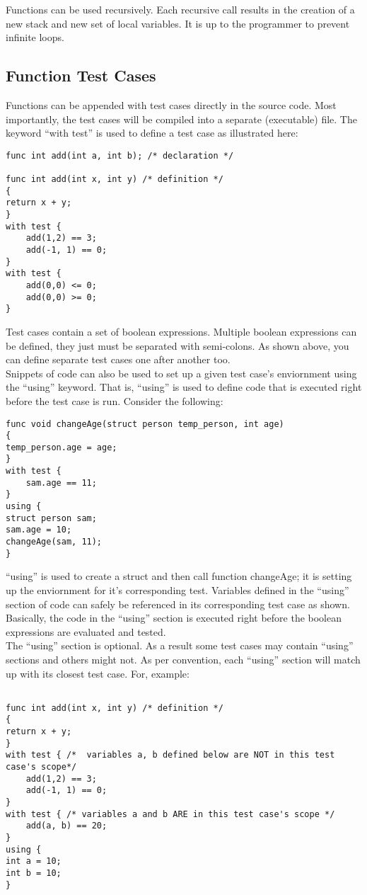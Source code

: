 \documentclass{article}
\begin{document}
Functions can be used recursively. Each recursive call results in the creation of a new stack and new set of local variables. It is up to the programmer to prevent infinite loops. 

\subsection{Function Test Cases}
Functions can be appended with test cases directly in the source code. Most importantly, the test cases will be compiled into a separate (executable) file. The keyword ``with test'' is used to define a test case as illustrated here:

\begin{lstlisting}
func int add(int a, int b); /* declaration */

func int add(int x, int y) /* definition */
{
return x + y;
}
with test {
	add(1,2) == 3;
	add(-1, 1) == 0;
}
with test {
	add(0,0) <= 0;
	add(0,0) >= 0; 
}

\end{lstlisting}
Test cases contain a set of boolean expressions. Multiple boolean expressions can be defined, they just must be separated with semi-colons. As shown above, you can define separate test cases one after another too. \\ 
Snippets of code can also be used to set up a given test case's enviornment using the ``using'' keyword. That is, ``using'' is used to define code that is executed right before the test case is run. Consider the following:

\begin{lstlisting}
func void changeAge(struct person temp_person, int age)
{
temp_person.age = age;
}
with test {
	sam.age == 11;
}
using {
struct person sam;
sam.age = 10;
changeAge(sam, 11);
}
\end{lstlisting}
``using'' is used to create a struct and then call function changeAge; it is setting up the enviornment for it's corresponding test. Variables defined in the ``using'' section of code can safely be referenced in its corresponding test case as shown. Basically, the code in the ``using'' section is executed right before the boolean expressions are evaluated and tested. \\
The ``using'' section is optional. As a result some test cases may contain ``using'' sections and others might not. As per convention, each ``using'' section will match up with its closest test case. For, example:

\begin{lstlisting}

func int add(int x, int y) /* definition */
{
return x + y;
}
with test { /*  variables a, b defined below are NOT in this test case's scope*/
	add(1,2) == 3;
	add(-1, 1) == 0;
}
with test { /* variables a and b ARE in this test case's scope */
	add(a, b) == 20;
}
using {
int a = 10;
int b = 10;
}

\end{lstlisting}
\end{document}
